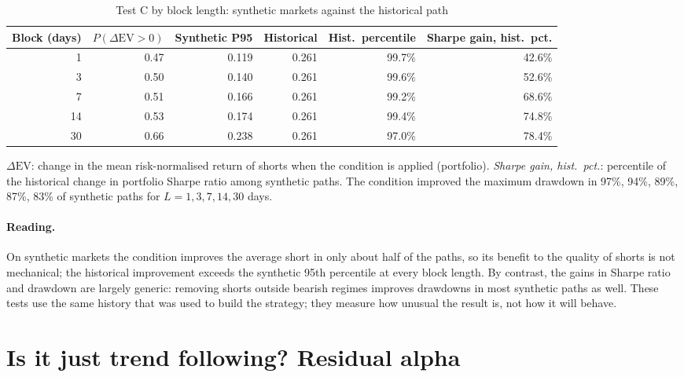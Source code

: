 \documentclass[11pt,a4paper]{article}
\newcommand{\1}{\mathbf{1}}
\begin{document}
\begin{table}[tbp]
\centering\small
\begin{threeparttable}
\caption{Test C by block length: synthetic markets against the historical path}\label{tab:testc}
\begin{tabular}{rrrrrr}
\toprule
Block (days) & $P(\Delta\mathrm{EV}>0)$ & Synthetic P95 & Historical & Hist.~percentile & Sharpe gain, hist.~pct. \\
\midrule
1 & 0.47 & 0.119 & 0.261 & 99.7\% & 42.6\% \\
3 & 0.50 & 0.140 & 0.261 & 99.6\% & 52.6\% \\
7 & 0.51 & 0.166 & 0.261 & 99.2\% & 68.6\% \\
14 & 0.53 & 0.174 & 0.261 & 99.4\% & 74.8\% \\
30 & 0.66 & 0.238 & 0.261 & 97.0\% & 78.4\% \\
\bottomrule
\end{tabular}
\begin{tablenotes}[flushleft]\footnotesize
\item $\Delta\mathrm{EV}$: change in the mean risk-normalised return of shorts when the condition is applied (portfolio). \emph{Sharpe gain, hist.~pct.}: percentile of the historical change in portfolio Sharpe ratio among synthetic paths. The condition improved the maximum drawdown in 97\%, 94\%, 89\%, 87\%, 83\% of synthetic paths for $L=1,3,7,14,30$ days.
\end{tablenotes}
\end{threeparttable}
\end{table}

\paragraph{Reading.} On synthetic markets the condition improves the average short in only about half of the paths, so its benefit to the quality of shorts is not mechanical; the historical improvement exceeds the synthetic 95th percentile at every block length. By contrast, the gains in Sharpe ratio and drawdown are largely generic: removing shorts outside bearish regimes improves drawdowns in most synthetic paths as well. These tests use the same history that was used to build the strategy; they measure how unusual the result is, not how it will behave.

\section{Is it just trend following? Residual alpha}\label{sec:alpha}
\end{document}
